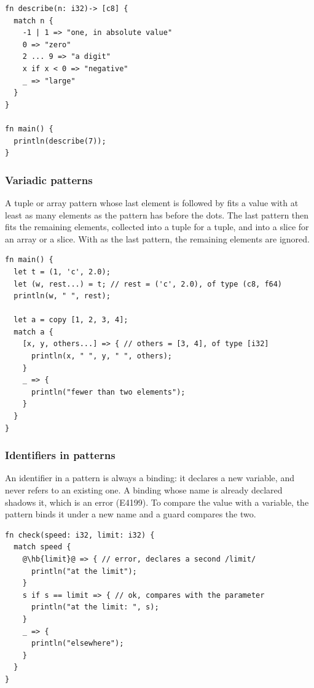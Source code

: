 \begin{lstlisting}[style=coloredverbatim, caption=Patterns on integers]
fn describe(n: i32)-> [c8] {
  match n {
    -1 | 1 => "one, in absolute value"
    0 => "zero"
    2 ... 9 => "a digit"
    x if x < 0 => "negative"
    _ => "large"
  }
}

fn main() {
  println(describe(7));
}
\end{lstlisting}

\subsubsection{Variadic patterns}

A tuple or array pattern whose last element is followed by  fits a
value with at least as many elements as the pattern has before the dots. The
last pattern then fits the remaining elements, collected into a tuple for a
tuple, and into a slice for an array or a slice. With \token{\_} as the last
pattern, the remaining elements are ignored.

\begin{lstlisting}[style=coloredverbatim, caption=Variadic tuple and array patterns]
fn main() {
  let t = (1, 'c', 2.0);
  let (w, rest...) = t; // rest = ('c', 2.0), of type (c8, f64)
  println(w, " ", rest);

  let a = copy [1, 2, 3, 4];
  match a {
    [x, y, others...] => { // others = [3, 4], of type [i32]
      println(x, " ", y, " ", others);
    }
    _ => {
      println("fewer than two elements");
    }
  }
}
\end{lstlisting}

\subsubsection{Identifiers in patterns}

An identifier in a pattern is always a binding: it declares a new variable, and
never refers to an existing one. A binding whose name is already declared shadows
it, which is an error (E4199). To compare the value with a variable, the pattern
binds it under a new name and a guard compares the two.

\begin{lstlisting}[style=coloredverbatimError, escapechar=@]
fn check(speed: i32, limit: i32) {
  match speed {
    @\hb{limit}@ => { // error, declares a second /limit/
      println("at the limit");
    }
    s if s == limit => { // ok, compares with the parameter
      println("at the limit: ", s);
    }
    _ => {
      println("elsewhere");
    }
  }
}
\end{lstlisting}

